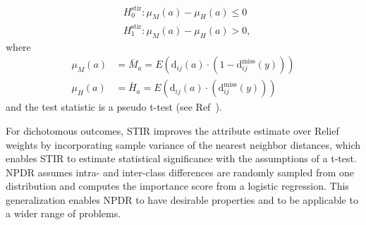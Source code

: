 \documentclass[10pt]{article}
\begin{document}

\begin{equation}
\begin{aligned}
    & H^{\text{stir}}_0: \mu_M(a) - \mu_H(a) \le 0 \\
    & H^{\text{stir}}_1: \mu_M(a) - \mu_H(a) > 0,
\end{aligned}
\end{equation}  
where
\begin{equation}
\begin{aligned}
    \mu_M(a) & = \bar{M}_a = E \left( \text{d}_{ij}(a) \cdot \left( 1-\text{d}^{\text{miss}}_{ij}(y) \right) \right) \\
    \mu_H(a) & = \bar{H}_a = E \left( \text{d}_{ij}(a) \cdot \left( \text{d}^{\text{miss}}_{ij}(y) \right) \right)
\end{aligned}
\end{equation}  
and the test statistic is a pseudo t-test (see Ref~\cite{stir}).

For dichotomous outcomes, STIR improves the attribute estimate over Relief weights by incorporating sample variance of the nearest neighbor distances, which enables STIR to estimate statistical significance with the assumptions of a t-test. NPDR assumes intra- and inter-class differences are randomly sampled from one distribution and computes the importance score from a logistic regression.
This generalization enables NPDR to have desirable properties and to be applicable to a wider range of problems.
\end{document}
